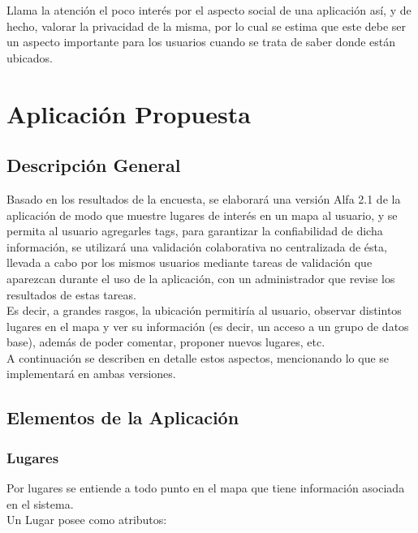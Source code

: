 \documentclass[10pt,letterpaper]{article}
\begin{document}
Llama la atención el poco interés por el aspecto social de una aplicación así, y de hecho, valorar la privacidad de la misma, por lo cual se estima que este debe ser un aspecto importante para los usuarios cuando se trata de saber donde están ubicados.\\

\newpage
\section{Aplicación Propuesta}

\subsection{Descripción General}

Basado en los resultados de la encuesta, se elaborará una versión Alfa 2.1 de la aplicación de modo que muestre lugares de interés en un mapa al usuario, y se permita al usuario agregarles tags, para garantizar la confiabilidad de dicha información, se utilizará una validación colaborativa no centralizada de ésta, llevada a cabo por los mismos usuarios mediante tareas de validación que aparezcan durante el uso de la aplicación, con un administrador que revise los resultados de estas tareas.\\

Es decir, a grandes rasgos, la ubicación permitiría al usuario, observar distintos lugares en el mapa y ver su información (es decir, un acceso a un grupo de datos base), además de poder comentar, proponer nuevos lugares, etc.\\

A continuación se describen en detalle estos aspectos, mencionando lo que se implementará en ambas versiones.\\

\subsection{Elementos de la Aplicación}

\subsubsection{Lugares}

Por lugares se entiende a todo punto en el mapa que tiene información asociada en el sistema.\\

Un Lugar posee como atributos:\\
\end{document}
